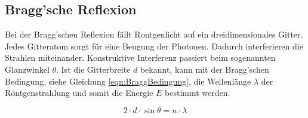 \subsection{Bragg'sche Reflexion}
\label{subsec:Bragg}

Bei der Bragg'schen Reflexion fällt Rontgenlicht auf ein dreidimensionales Gitter.
Jedes Gitteratom sorgt für eine Beugung der Photonen.
Dadurch interferieren die Strahlen miteinander.
Konstruktive Interferenz passiert beim sogenannten Glanzwinkel $\theta$.
Ist die Gitterbreite $d$ bekannt, kann mit der Bragg'schen Bedingung, siehe Gleichung \eqref{eqn:BraggBedingung},
die Wellenlänge $\lambda$ der Röntgenstrahlung und somit die Energie $E$ bestimmt werden.

\begin{equation}
    \label{eqn:BraggBedingung}
    2 \cdot d \cdot \sin\theta = n \cdot \lambda
\end{equation}